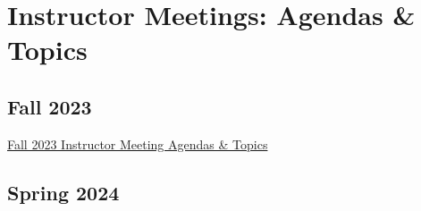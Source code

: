 \documentclass[
]{book}
\begin{document}
\hypertarget{instructor-meetings-agendas-topics}{%
\chapter{Instructor Meetings: Agendas \& Topics}\label{instructor-meetings-agendas-topics}}

\hypertarget{fall-2023}{%
\section{Fall 2023}\label{fall-2023}}

\href{https://docs.google.com/document/d/1Q_QcuQYQq2zpa6WMIYnB7TajFqMtxD8W2Eht7Zb3PRU/edit?usp=sharing}{Fall 2023 Instructor Meeting Agendas \& Topics}

\hypertarget{spring-2024}{%
\section{Spring 2024}\label{spring-2024}}

  
\end{document}
